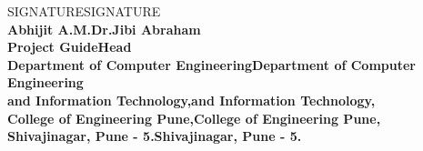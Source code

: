 \begin{center}		%

SIGNATURESIGNATURE\\
\normalsize{\bf{Abhijit A.M.Dr.Jibi Abraham\\
Project GuideHead}\\
Department of Computer EngineeringDepartment of Computer Engineering\\
and Information Technology,and Information Technology,\\
College of Engineering Pune,College of Engineering Pune,\\
Shivajinagar, Pune - 5.Shivajinagar, Pune - 5.}
\end{center}

